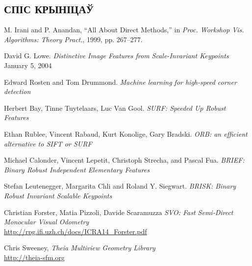 \patchcmd{\thebibliography}{\chapter*}{\section*}{}{}

\begin{center}
    \section*{СПІС КРЫНІЦАЎ}
\end{center}

\renewcommand*\bibname{}

\begin{thebibliography}{9}

M. Irani and P. Anandan, “All About Direct Methods,” in
\textit{Proc. Workshop Vis. Algorithms: Theory Pract.}, 1999, pp. 267–277.

David G. Lowe.
\textit{Distinctive Image Features from Scale-Invariant Keypoints}
January 5, 2004

Edward Rosten and Tom Drummond.
\textit{Machine learning for high-speed corner detection}

Herbert Bay, Tinne Tuytelaars, Luc Van Gool.
\textit{SURF: Speeded Up Robust Features}

Ethan Rublee, Vincent Rabaud, Kurt Konolige, Gary Bradski.
\textit{ORB: an efficient alternative to SIFT or SURF}

Michael Calonder, Vincent Lepetit, Christoph Strecha, and Pascal Fua.
\textit{BRIEF: Binary Robust Independent Elementary Features}

Stefan Leutenegger, Margarita Chli and Roland Y. Siegwart.
\textit{BRISK: Binary Robust Invariant Scalable Keypoints}

Christian Forster, Matia Pizzoli, Davide Scaramuzza
\textit{SVO: Fast Semi-Direct Monocular Visual Odometry}
\\{\url{http://rpg.ifi.uzh.ch/docs/ICRA14_Forster.pdf}}

Chris Sweeney, \textit{Theia Multiview Geometry Library}
\\{\url{http://theia-sfm.org}}

\end{thebibliography}

\newpage
